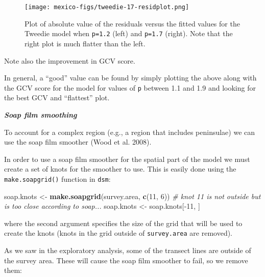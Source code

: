 \documentclass[]{amsart}
\newenvironment{Shaded}{}{}
\newcommand{\KeywordTok}[1]{\textcolor[rgb]{0.00,0.44,0.13}{\textbf{{#1}}}}
\newcommand{\DataTypeTok}[1]{\textcolor[rgb]{0.56,0.13,0.00}{{#1}}}
\newcommand{\DecValTok}[1]{\textcolor[rgb]{0.25,0.63,0.44}{{#1}}}
\newcommand{\StringTok}[1]{\textcolor[rgb]{0.25,0.44,0.63}{{#1}}}
\newcommand{\CommentTok}[1]{\textcolor[rgb]{0.38,0.63,0.69}{\textit{{#1}}}}
\newcommand{\NormalTok}[1]{{#1}}
\begin{document}
\begin{figure}[htbp]
\centering
\texttt{[image: mexico-figs/tweedie-17-residplot.png]}
\caption{Plot of absolute value of the residuals versus the fitted
values for the Tweedie model when \texttt{p=1.2} (left) and
\texttt{p=1.7} (right). Note that the right plot is much flatter than
the left.}
\end{figure}

Note also the improvement in GCV score.

In general, a ``good'' value can be found by simply plotting the above
along with the GCV score for the model for values of \texttt{p} between
1.1 and 1.9 and looking for the best GCV and ``flattest'' plot.

\textbf{\emph{Soap film smoothing}}

To account for a complex region (e.g., a region that includes
peninsulae) we can use the soap film smoother (Wood et al. 2008).

In order to use a soap film smoother for the spatial part of the model
we must create a set of knots for the smoother to use. This is easily
done using the \texttt{make.soapgrid()} function in \texttt{dsm}:

\begin{Shaded}
\begin{Highlighting}[]
\NormalTok{soap.knots <-}\StringTok{ }\KeywordTok{make.soapgrid}\NormalTok{(survey.area, }\KeywordTok{c}\NormalTok{(}\DecValTok{11}\NormalTok{, }\DecValTok{6}\NormalTok{))}
\CommentTok{# knot 11 is not outside but is too close according to soap...}
\NormalTok{soap.knots <-}\StringTok{ }\NormalTok{soap.knots[-}\DecValTok{11}\NormalTok{, ]}
\end{Highlighting}
\end{Shaded}

where the second argument specifies the size of the grid that will be
used to create the knots (knots in the grid outside of
\texttt{survey.area} are removed).

As we saw in the exploratory analysis, some of the transect lines are
outside of the survey area. These will cause the soap film smoother to
fail, so we remove them:

\begin{Shaded}
\end{Shaded}
\end{document}
